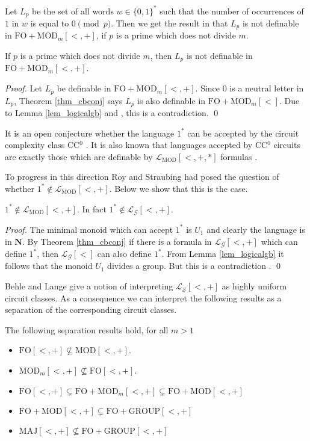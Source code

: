 \documentclass[envcountsame]{llncs}
\newcommand{\FO}{\mathrm{FO}}
\newcommand{\GROUP}{\mathrm{GROUP}}
\newcommand{\MOD}{\mathrm{MOD}}
\newcommand{\MAJ}{\mathrm{MAJ}}
\newcommand{\NL}{\mathbf{N}}
\begin{document}
Let $L_p$ be the set of all words $w \in \{0,1\}^*$ such that the number of occurrences of $1$ in $w$ is equal to $0 \pmod p$. Then we
get the result in \cite{roy_defGenFO} that $L_p$ is not definable in $\FO+\MOD_m[<,+]$, if $p$ is a prime which does not divide
$m$.
\begin{corollary}
  If $p$ is a prime which does not divide $m$, then $L_p$ is not definable in $\FO+\MOD_m[<,+]$.
\end{corollary}
\begin{proof}
  Let $L_p$ be definable in $\FO+\MOD_m[<,+]$. Since $0$ is a neutral letter in $L_p$, Theorem \ref{thm_cbconj} says
  $L_p$ is also definable in $\FO+\MOD_m[<]$.  Due to Lemma \ref{lem_logicalgb} and \cite{str_cirBook}, this is a contradiction.
\qed \end{proof}

It is an open conjecture whether the language $1^*$ can be accepted by the circuit complexity class CC$^0$ \cite{str_cirBook}. It is also known that languages accepted by CC$^0$ circuits are exactly those which are definable by $\mathcal{L}_{\MOD}[<,+,*]$ formulas \cite{vollmer_book}. 

To progress in this direction Roy and Straubing \cite{roy_defGenFO} had posed the question of whether $1^* \notin \mathcal{L}_{\MOD}[<,+]$. Below we show that this is the case. 


\begin{corollary}
 $1^* \notin \mathcal{L}_{\MOD}[<,+]$. In fact $1^* \notin \mathcal{L_{G}}[<,+]$.
\end{corollary}
\begin{proof}
  The minimal monoid which can accept $1^*$ is $U_1$ and clearly the language is in $\NL$. By Theorem \ref{thm_cbconj} if
  there is a formula in $\mathcal{L_G}[<,+]$ which can define $1^*$, then $\mathcal{L_G}[<]$ can also define $1^*$.
  From Lemma \ref{lem_logicalgb} it follows that the monoid $U_1$ divides a group. But this is a contradiction \cite{str_cirBook}.
\qed \end{proof}

Behle and Lange \cite{behle_foLessUniform} give a notion of interpreting $\mathcal{L_S}[<,+]$ as highly uniform circuit classes.  As a consequence we can interpret the following results as a separation of the corresponding circuit classes.
\begin{corollary}
The following separation results hold, for all $m>1$
\begin{itemize}
\item $\FO[<,+] \not \subseteq \MOD[<,+]$.
\item $\MOD_m[<,+] \not \subseteq \FO[<,+]$.
\item $\FO[<,+] \subsetneq \FO+\MOD_m[<,+] \subsetneq \FO+\MOD[<,+]$
\item $\FO+\MOD[<,+] \subsetneq \FO+\GROUP[<,+]$
\item $\MAJ[<,+] \not \subseteq \FO+\GROUP[<,+]$
\end{itemize}
\end{corollary}
\end{document}
